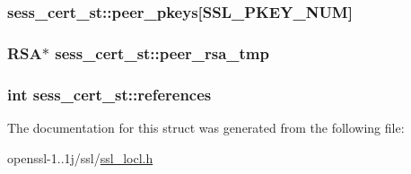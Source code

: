 \hypertarget{structsess__cert__st_a1430cf781fb5735b9884b2273005683e}{
\subsubsection[{peer\-\_\-pkeys}]{ sess\-\_\-cert\-\_\-st\-::peer\-\_\-pkeys\mbox{[}{\bf S\-S\-L\-\_\-\-P\-K\-E\-Y\-\_\-\-N\-U\-M}\mbox{]}}}\label{structsess__cert__st_a1430cf781fb5735b9884b2273005683e}
\hypertarget{structsess__cert__st_a589cc0b60fd0b93e39ac7829416a6b69}{
\subsubsection[{peer\-\_\-rsa\-\_\-tmp}]{\setlength{\rightskip}{0pt plus 5cm}R\-S\-A$\ast$ sess\-\_\-cert\-\_\-st\-::peer\-\_\-rsa\-\_\-tmp}}\label{structsess__cert__st_a589cc0b60fd0b93e39ac7829416a6b69}
\hypertarget{structsess__cert__st_a5f7d4df032e6fdb64bf4434497846616}{
\subsubsection[{references}]{\setlength{\rightskip}{0pt plus 5cm}int sess\-\_\-cert\-\_\-st\-::references}}\label{structsess__cert__st_a5f7d4df032e6fdb64bf4434497846616}


The documentation for this struct was generated from the following file\-:\begin{DoxyCompactItemize}
\item 
openssl-\/1..\-1j/ssl/\hyperlink{ssl__locl_8h}{ssl\-\_\-locl.\-h}\end{DoxyCompactItemize}
